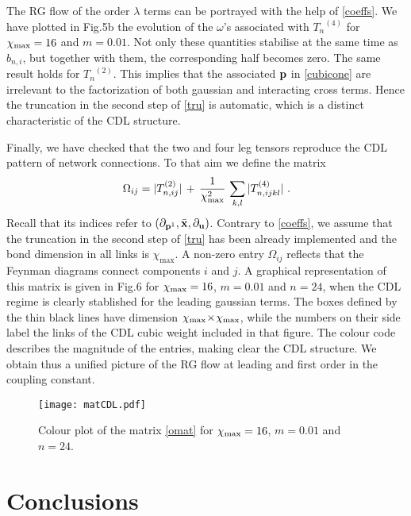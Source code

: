 \documentclass[a4paper,preprintnumbers,nofootinbib,twocolumn]{quantumarticle}
\newcommand{\be}{\begin{equation}} \newcommand{\ee}{\end{equation}}
\begin{document}
The RG flow of the order $\lambda$ terms can be portrayed with the help of 
\eqref{coeffs}. We have plotted in Fig.5b the evolution of the $\omega$'s associated with ${T_n}^{(4)}$
for $\chi_{\rm max}=16$ and $m=0.01$. Not only these quantities stabilise at the same time as $b_{n,i}$, 
but together with them, the corresponding half becomes zero. The same result holds for ${T_n}^{(2)}$.
This implies that the associated ${\bf p}$ in \eqref{cubicone} are irrelevant to the factorization of both gaussian and interacting cross terms. 
Hence the truncation in the second step of \eqref{tru} is automatic, which is a distinct characteristic of the CDL structure.

Finally, we have checked that the 
two and four leg tensors reproduce the CDL pattern of network connections.  
To that aim we define the matrix
\be
\Omega_{ij}= |T_{n,ij}^{(2)}|\,+\,{1 \over \chi_{\rm max}^2} \, \sum_{k,l} | T^{(4)}_{n,ijkl} | \ .
\label{omat}
\ee 
Recall that its indices refer to $( \partial_{{\bf p}^1},{\bar {\bf x}}, \partial_{{\bf u}})$. Contrary to \eqref{coeffs}, we assume that the truncation in the second step of \eqref{tru} has been already implemented and
the bond dimension in all links is $\chi_{\max}$.
A non-zero entry $\Omega_{ij}$ reflects that the Feynman diagrams connect components $i$ and $j$.
A graphical representation of this matrix is given in Fig.6 for $\chi_{\rm max}=16$, $m=0.01$ and $n=24$, when the CDL regime is clearly stablished for the leading gaussian terms.
The boxes defined by the thin black lines have dimension $\chi_{\rm max}\!\times \!\chi_{\rm max}$, while the numbers on their side label the links of the CDL cubic weight included in that figure.
The colour code describes the magnitude of the entries, making clear the CDL structure. 
We obtain thus a unified picture of the RG flow at leading and first order in the coupling constant.

\vspace*{-17mm}
\begin{figure}[h]
\begin{center}
\texttt{[image: matCDL.pdf]} \hspace{10mm}
\end{center}
\vspace*{-22mm}
\caption{\label{fig:fe4} Colour plot of the matrix \eqref{omat} for $\chi_{\rm max}=16$, $m=0.01$ and $n=24$.}
\end{figure}
\vspace*{-5mm}

\section{Conclusions}
\end{document}

